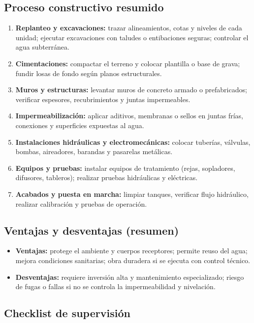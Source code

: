 \documentclass[12pt]{article}
\begin{document}
	\subsection*{Proceso constructivo resumido}
	\begin{enumerate}[leftmargin=*, itemsep=2pt]
		\item \textbf{Replanteo y excavaciones:} trazar alineamientos, cotas y niveles de cada unidad; ejecutar excavaciones con taludes o entibaciones seguras; controlar el agua subterránea.
		\item \textbf{Cimentaciones:} compactar el terreno y colocar plantilla o base de grava; fundir losas de fondo según planos estructurales.
		\item \textbf{Muros y estructuras:} levantar muros de concreto armado o prefabricados; verificar espesores, recubrimientos y juntas impermeables.
		\item \textbf{Impermeabilización:} aplicar aditivos, membranas o sellos en juntas frías, conexiones y superficies expuestas al agua.
		\item \textbf{Instalaciones hidráulicas y electromecánicas:} colocar tuberías, válvulas, bombas, aireadores, barandas y pasarelas metálicas.
		\item \textbf{Equipos y pruebas:} instalar equipos de tratamiento (rejas, sopladores, difusores, tableros); realizar pruebas hidráulicas y eléctricas.
		\item \textbf{Acabados y puesta en marcha:} limpiar tanques, verificar flujo hidráulico, realizar calibración y pruebas de operación.
	\end{enumerate}
	
	\subsection*{Ventajas y desventajas (resumen)}
	\begin{itemize}[leftmargin=*, itemsep=2pt]
		\item \textbf{Ventajas:} protege el ambiente y cuerpos receptores; permite reuso del agua; mejora condiciones sanitarias; obra duradera si se ejecuta con control técnico.
		\item \textbf{Desventajas:} requiere inversión alta y mantenimiento especializado; riesgo de fugas o fallas si no se controla la impermeabilidad y nivelación.
	\end{itemize}
	
	\subsection{Checklist de supervisión}
	
\end{document}
